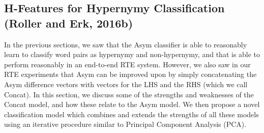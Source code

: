 \documentclass[12pt]{article}
\begin{document}
\subsection{H-Features for Hypernymy Classification (Roller and Erk, 2016b)}
\label{sec:hfeatures}

In the previous sections, we saw that the Asym classifier is able to reasonably
learn to classify word pairs as hypernymy and non-hypernymy, and that is able
to perform reasonably in an end-to-end RTE system. However, we also saw in our
RTE experiments that Asym can be improved upon by simply concatenating the Asym
difference vectors with vectors for the LHS and the RHS (which we call Concat).
In this section, we discuss some of the strengths and weaknesses of the Concat
model, and how these relate to the Asym model. We then propose a novel
classification model which combines and extends the strengths of all these
models using an iterative procedure similar to Principal Component Analysis
(PCA).

%
%
%
%
\end{document}
